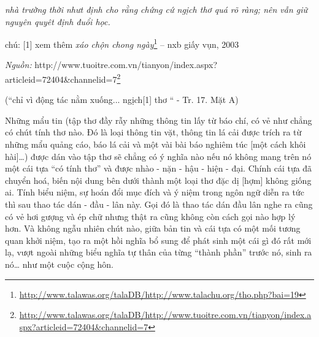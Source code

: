 \documentclass[../main.tex]{subfiles}
\begin{document}
\begin{multicols}{2}
\begin{blockquote}
\textit{nhà trường thời nhưt định cho rằng chứng cứ ngịch thơ quá rõ ràng; nên vẫn giữ nguyên quyêt định đuổi học. } 
 
chú: \small{[1]} xem thêm \textit{xáo chộn chong ngày}\footnote{\url{http://www.talawas.org/talaDB/http://www.talachu.org/tho.php?bai=19}} – nxb giấy vụn, 2003 
 
\textit{Nguồn:} http://www.tuoitre.com.vn/tianyon/index.aspx?articleid=72404&channelid=7\footnote{\url{http://www.talawas.org/talaDB/http://www.tuoitre.com.vn/tianyon/index.aspx?articleid=72404&channelid=7}}      
        
(“chỉ vì động tác nằm xuống... ngịch[1] thơ “ - Tr. 17. Mặt A) 

\end{blockquote}
 
Những mẩu tin (tập thơ đầy rẫy những thông tin lấy từ báo chí, có vẻ như chẳng có chút tính thơ nào. Đó là loại thông tin vặt, thông tin lá cải được trích ra từ những mẩu quảng cáo, báo lá cải và một vài bài báo nghiêm túc [một cách khôi hài]…) được dán vào tập thơ sẽ chẳng có ý nghĩa nào nếu nó không mang trên nó một cái tựa “có tính thơ” và được nhào - nặn - hậu - hiện - đại. Chính cái tựa đã chuyển hoá, biến nội dung bên dưới thành một loại thơ đặc dị [hợm] không giống ai. Tính biểu niệm, sự hoán đổi mục đích và ý niệm trong ngôn ngữ diễn ra tức thì sau thao tác dán - đầu - lân này. Gọi đó là thao tác dán đầu lân nghe ra cũng có vẻ hơi gượng và ép chữ nhưng thật ra cũng không còn cách gọi nào hợp lý hơn. Và không ngẫu nhiên chút nào, giữa bản tin và cái tựa có một mối tương quan khởi niệm, tạo ra một hồi nghĩa bổ sung để phát sinh một cái gì đó rất mới lạ, vượt ngoài những biểu nghĩa tự thân của từng “thành phần” trước nó, sinh ra nó… như một cuộc cộng hôn.  
\end{multicols}
\end{document}
